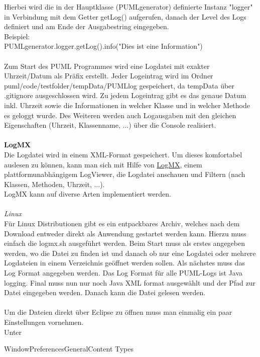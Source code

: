 Hierbei wird die in der Hauptklasse (PUMLgenerator) definierte Instanz "logger" in Verbindung mit dem Getter getLog() aufgerufen, danach der Level des Logs definiert und am Ende der Ausgabestring eingegeben.\\
Beispiel:\\
PUMLgenerator.logger.getLog().info("Dies ist eine Information")\\
\\
Zum Start des PUML Programmes wird eine Logdatei mit exakter Uhrzeit/Datum als Präfix erstellt.
Jeder Logeintrag wird im Ordner puml/code/testfolder/tempData/PUMLlog gespeichert, da tempData über .gitignore ausgeschlossen wird. Zu jedem Logeintrag gibt es das genaue Datum inkl. Uhrzeit sowie die Informationen in welcher Klasse und in welcher Methode es geloggt wurde.
Des Weiteren werden auch Logausgaben mit den gleichen Eigenschaften (Uhrzeit, Klassenname, ...) über die Console realisiert.\\\\
\textbf{LogMX}\\
Die Logdatei wird in einem XML-Format gespeichert. Um dieses komfortabel auslesen zu können, kann man sich mit Hilfe von
\href{https://logmx.com/download}{LogMX}, einem plattformunabhängigem LogViewer, die Logdatei anschauen und Filtern (nach Klassen, Methoden, Uhrzeit, ...). \\
LogMX kann auf diverse Arten implementiert werden.\\\\
\emph{Linux}\\
Für Linux Distributionen gibt es ein entpackbares Archiv, welches nach dem Download entweder direkt als Anwendung gestartet werden kann. Hierzu muss einfach die logmx.sh ausgeführt werden. Beim Start muss als erstes angegeben werden, wo die Datei zu finden ist und danach ob nur eine Logdatei oder mehrere Logdateien in einem Verzeichnis geöffnet werden sollen. Als nächstes muss das Log Format angegeben werden. Das Log Format für alle PUML-Logs ist Java logging. Final muss nun nur noch Java XML format ausgewählt und der Pfad zur Datei eingegeben werden. Danach kann die Datei gelesen werden.\\\\
Um die Dateien direkt über Eclipse zu öffnen muss man einmalig ein paar Einstellungen vornehmen.\\
Unter
\begin{center}
\rightarrow Window\rightarrow Preferences\rightarrow General\rightarrow Content Types
\end{center}
